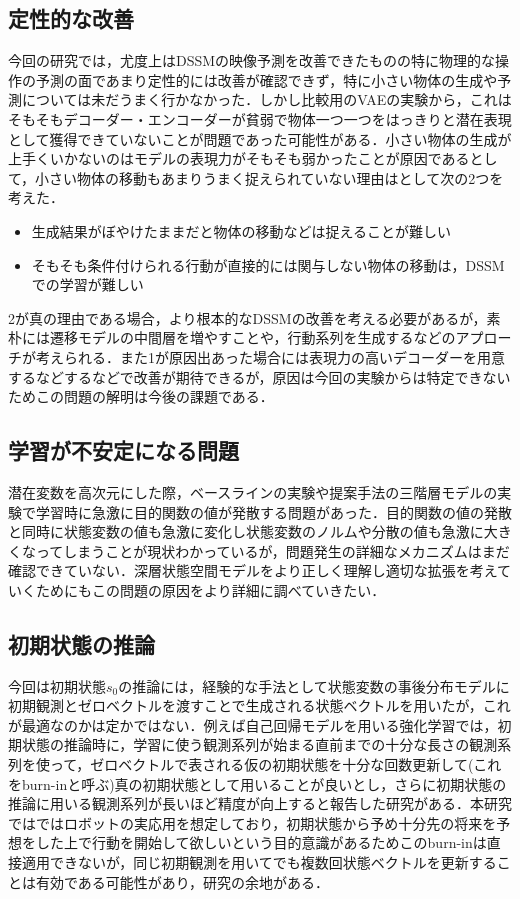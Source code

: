\subsection{定性的な改善}
今回の研究では，尤度上はDSSMの映像予測を改善できたものの特に物理的な操作の予測の面であまり定性的には改善が確認できず，特に小さい物体の生成や予測については未だうまく行かなかった．しかし比較用のVAEの実験から，これはそもそもデコーダー・エンコーダーが貧弱で物体一つ一つをはっきりと潜在表現として獲得できていないことが問題であった可能性がある．小さい物体の生成が上手くいかないのはモデルの表現力がそもそも弱かったことが原因であるとして，小さい物体の移動もあまりうまく捉えられていない理由はとして次の2つを考えた．
\begin{itemize}
    \item 生成結果がぼやけたままだと物体の移動などは捉えることが難しい
    \item そもそも条件付けられる行動が直接的には関与しない物体の移動は，DSSMでの学習が難しい
\end{itemize}
2が真の理由である場合，より根本的なDSSMの改善を考える必要があるが，素朴には遷移モデルの中間層を増やすことや，行動系列を生成するなどのアプローチが考えられる．また1が原因出あった場合には表現力の高いデコーダーを用意するなどするなどで改善が期待できるが，原因は今回の実験からは特定できないためこの問題の解明は今後の課題である．

\subsection{学習が不安定になる問題}
潜在変数を高次元にした際，ベースラインの実験や提案手法の三階層モデルの実験で学習時に急激に目的関数の値が発散する問題があった．目的関数の値の発散と同時に状態変数の値も急激に変化し状態変数のノルムや分散の値も急激に大きくなってしまうことが現状わかっているが，問題発生の詳細なメカニズムはまだ確認できていない．深層状態空間モデルをより正しく理解し適切な拡張を考えていくためにもこの問題の原因をより詳細に調べていきたい．

\subsection{初期状態の推論}
今回は初期状態$s_0$の推論には，経験的な手法として状態変数の事後分布モデルに初期観測とゼロベクトルを渡すことで生成される状態ベクトルを用いたが，これが最適なのかは定かではない．例えば自己回帰モデルを用いる強化学習\cite{kapturowski2018recurrent}では，初期状態の推論時に，学習に使う観測系列が始まる直前までの十分な長さの観測系列を使って，ゼロベクトルで表される仮の初期状態を十分な回数更新して(これをburn-inと呼ぶ)真の初期状態として用いることが良いとし，さらに初期状態の推論に用いる観測系列が長いほど精度が向上すると報告した研究がある\cite{kapturowski2018recurrent}．本研究ではではロボットの実応用を想定しており，初期状態から予め十分先の将来を予想をした上で行動を開始して欲しいという目的意識があるためこのburn-inは直接適用できないが，同じ初期観測を用いてでも複数回状態ベクトルを更新することは有効である可能性があり，研究の余地がある．

